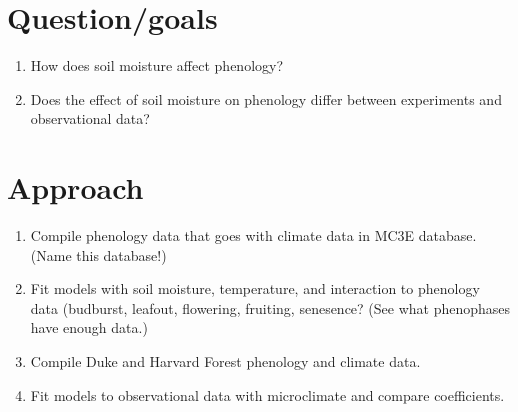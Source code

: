 \documentclass{article}
\begin{document}


\clearpage

\section*{Question/goals}
\begin{enumerate}
\item{How does soil moisture affect phenology?}
\item{Does the effect of soil moisture on phenology differ between experiments and observational data?}
\end{enumerate}
\section*{Approach}
\begin{enumerate}
\item{Compile phenology data that goes with climate data in MC3E database. (Name this database!)}
\item{Fit models with soil moisture, temperature, and interaction to phenology data (budburst, leafout, flowering, fruiting, senesence? (See what phenophases have enough data.)}
\item{Compile Duke and Harvard Forest phenology and climate data.}
\item{Fit models to observational data with microclimate and compare coefficients.}
\end{enumerate}




\end{document}
